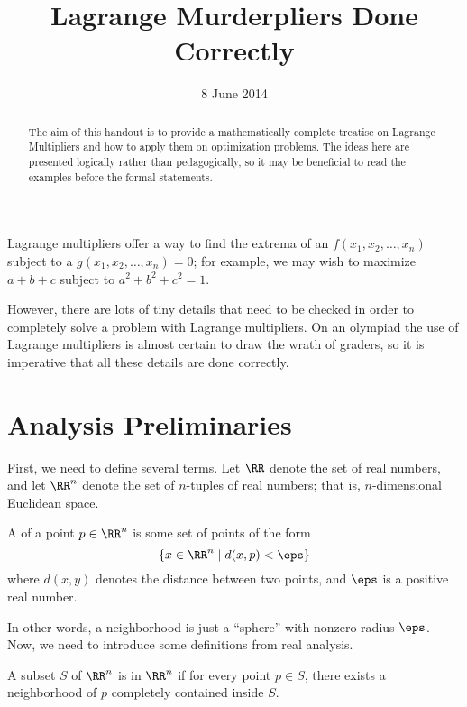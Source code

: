 \documentclass[11pt]{scrartcl}
\begin{document}
\title{Lagrange Murderpliers Done Correctly}
\date{8 June 2014}
\maketitle

\begin{abstract}
  The aim of this handout is to provide a mathematically complete treatise
  on Lagrange Multipliers and how to apply them on optimization problems.
  The ideas here are presented logically rather than pedagogically,
  so it may be beneficial to read the examples before the formal statements.
\end{abstract}

Lagrange multipliers offer a way to find the extrema
of an  $f(x_1, x_2, \dots, x_n)$ subject to a
 $g(x_1, x_2, \dots, x_n) = 0$;
for example, we may wish to maximize $a+b+c$ subject to $a^2+b^2+c^2=1$.

However, there are lots of tiny details that need to be checked in order
to completely solve a problem with Lagrange multipliers.
On an olympiad the use of Lagrange multipliers is almost certain to
draw the wrath of graders,
so it is imperative that all these details are done correctly.

\section{Analysis Preliminaries}
First, we need to define several terms.
Let $\RR$ denote the set of real numbers,
and let $\RR^n$ denote the set of $n$-tuples of real numbers;
that is, $n$-dimensional Euclidean space.

\begin{definition}
  A  of a point $p \in \RR^n$ is some set of points of the form
  \[ \left\{ x \in \RR^n \mid d(x,p) < \eps \right\} \]
  where $d(x,y)$ denotes the distance between two points, and $\eps$ is a positive real number.
\end{definition}
In other words, a neighborhood is just a ``sphere'' with nonzero radius $\eps$.
Now, we need to introduce some definitions from real analysis.

\begin{definition}
  A subset $S$ of $\RR^n$ is  in $\RR^n$ if for every point $p \in S$,
  there exists a neighborhood of $p$ completely contained inside $S$.
\end{definition}
\end{document}
